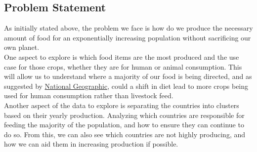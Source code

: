 \documentclass[12pt, a4paper]{article}
\begin{document}
\begin{spacing}{1.1}
	\section{Problem Statement}
	As initially stated above, the problem we face is how do we produce the necessary amount of food for an exponentially increasing population without sacrificing our own planet. \vspace*{2mm}\\	
	One aspect to explore is which food items are the most produced and the use case for those crops, whether they are for human or animal consumption. This will allow us to understand where a majority of our food is being directed, and as suggested by \href{https://www.nationalgeographic.com/foodfeatures/feeding-9-billion/}{National Geographic}, could a shift in diet lead to more crops being used for human consumption rather than livestock feed.\vspace*{2mm}\\	
	Another aspect of the data to explore is separating the countries into clusters based on their yearly production. Analyzing which countries are responsible for feeding the majority of the population, and how to ensure they can continue to do so. From this, we can also see which countries are not highly producing, and how we can aid them in increasing production if possible. \newpage	
	


\end{spacing}
\end{document}
